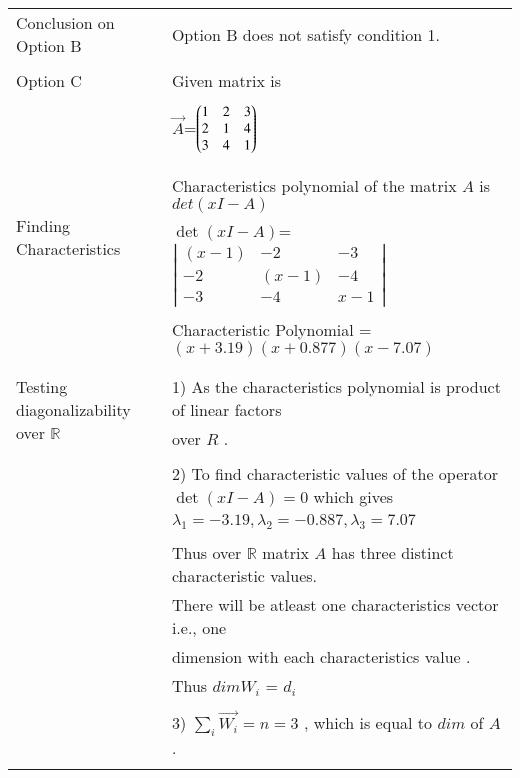 \documentclass[journal,12pt]{IEEEtran}
\begin{document}
\begin{longtable}{|l|l|}
&\\
\hline
\multirow{3}{*}{Conclusion on Option B} & \\
& Option B does not satisfy condition 1. \\
&\\
\hline \hline
\multirow{3}{*}{Option C} & \\
& Given matrix is  \\
&\\
& $\vec{A}$=$\begin{pmatrix}1&2&3\\2&1&4\\3&4&1\end{pmatrix}$\\
&\\
\hline
\multirow{3}{*}{Finding Characteristics} & \\
&
Characteristics polynomial of the matrix $A$ is $det(xI-A)$\\ 
polynomial
& $\det(xI-A)$= $\left|
                \begin{array}{ccc}
                (x-1) & -2 & -3\\
                -2 & (x-1) & -4\\
                -3 & -4 & x-1
                \end{array} \right|$  \\
&\\
& Characteristic Polynomial = $(x+3.19)(x+0.877)(x-7.07)$\\
&\\
\hline
\multirow{3}{*}{Testing diagonalizability over $\mathbb{R}$} & \\
& 1) As the characteristics  polynomial is product of linear factors\\
&over $R$ .\\
&\\
&2) To find characteristic values of the operator $\det(xI-A) = 0$ which gives  \\
& $\lambda_1= -3.19 , \lambda_2= -0.887, \lambda_3= 7.07$\\
&\\
& Thus over $\mathbb{R}$ matrix $A$ has three distinct characteristic values.\\
&There will be atleast one characteristics vector i.e., one\\ & dimension with each characteristics value .\\
&Thus $dim W_i$ = $d_i$\\
&\\
&3) $\sum_{i} \vec{W_i} = n = 3$ , which is equal to $dim$ of $A$.\\ 
&\\

\end{longtable}
\end{document}
